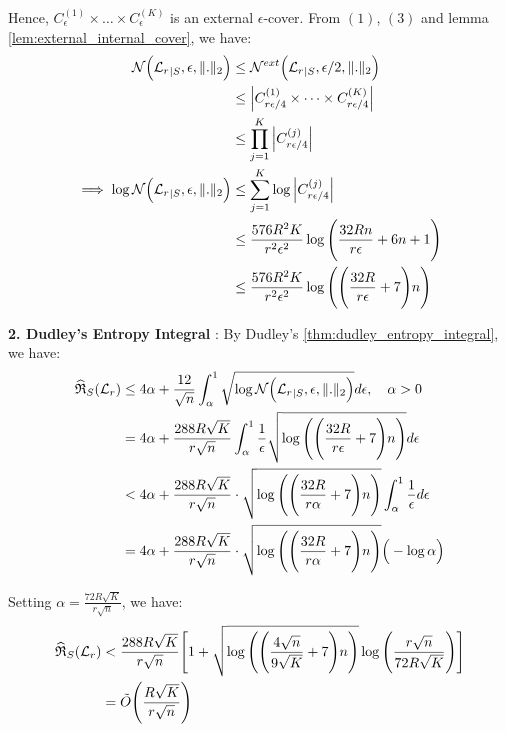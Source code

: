 \noindent Hence, $C^{(1)}_\epsilon \times \dots \times C^{(K)}_\epsilon$ is an external $\epsilon$-cover. From $(1)$, $(3)$ and lemma \ref{lem:external_internal_cover}, we have:
\begin{align*}
    \mathcal{N}\Big( {\mathcal{L}_r}_{|S}, \epsilon, \|.\|_2 \Big) 
        &\le \mathcal{N}^{ext}\Big( {\mathcal{L}_r}_{|S}, \epsilon/2, \|.\|_2 \Big) \\ 
        &\le \Big| 
            C^{(1)}_{r\epsilon/4} \times \dots \times C^{(K)}_{r\epsilon/4}
         \Big| \\
        &\le \prod_{j=1}^K \Big| C^{(j)}_{r\epsilon/4} \Big| \\
    \implies
    \log \mathcal{N}\Big( {\mathcal{L}_r}_{|S}, \epsilon, \|.\|_2 \Big) 
        &\le \sum_{j=1}^K \log \Big| C^{(j)}_{r\epsilon/4} \Big| \\
        &\le \frac{576R^2K}{r^2\epsilon^2} \log\Bigg( 
            \frac{32Rn}{r\epsilon} + 6n + 1
         \Bigg) \\
        &\le \frac{576R^2K}{r^2\epsilon^2} \log\Bigg( 
            \Bigg( \frac{32R}{r\epsilon} + 7 \Bigg)n
         \Bigg)
\end{align*}


\noindent \textbf{2. Dudley's Entropy Integral} : By Dudley's \ref{thm:dudley_entropy_integral}, we have:
\begin{align*}
    \widehat{\mathfrak{R}}_S(\mathcal{L}_r) &\le 4\alpha + \frac{12}{\sqrt n}\int_\alpha^1 \sqrt{\log \mathcal{N}\Big( {\mathcal{L}_r}_{|S}, \epsilon, \|.\|_2 \Big)}d\epsilon, \ \ \ \alpha > 0 \\
    &= 4\alpha + \frac{288R\sqrt K}{r\sqrt n} \int_\alpha^1 \frac{1}{\epsilon}\sqrt{
        \log\Bigg( 
            \Bigg( \frac{32R}{r\epsilon} + 7 \Bigg)n
         \Bigg) 
    }d\epsilon \\
    &< 4\alpha + \frac{288R\sqrt K}{r\sqrt n}\cdot\sqrt{
        \log\Bigg( 
            \Bigg( \frac{32R}{r\alpha} + 7 \Bigg)n
         \Bigg) 
    }\int_{\alpha}^1 \frac{1}{\epsilon}d\epsilon \\
    &= 4\alpha + \frac{288R\sqrt K}{r\sqrt n}\cdot\sqrt{
        \log\Bigg( 
            \Bigg( \frac{32R}{r\alpha} + 7 \Bigg)n
         \Bigg) 
    }\Big( -\log\alpha \Big)
\end{align*}

\noindent Setting $\alpha = \frac{72R\sqrt{K}}{r\sqrt n}$, we have:
\begin{align*}
    \widehat{\mathfrak{R}}_S(\mathcal{L}_r) &< \frac{288R\sqrt K}{r\sqrt n}\Bigg[ 1 + \sqrt{
        \log\Bigg( 
            \Bigg( \frac{4\sqrt n}{9\sqrt K} + 7 \Bigg)n
         \Bigg) 
    }\log\Bigg( \frac{r\sqrt{n}}{72R\sqrt K} \Bigg) \Bigg] \\
    &= \tilde O\Bigg( 
        \frac{R\sqrt K}{r\sqrt n}
     \Bigg)
\end{align*}

